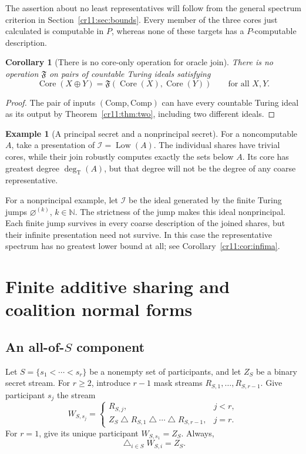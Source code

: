 \documentclass[11pt,letterpaper]{article}
\theoremstyle{plain}
\newtheorem{corollary}[theorem]{Corollary}
\theoremstyle{definition}
\newtheorem{example}[theorem]{Example}
\theoremstyle{remark}
\numberwithin{equation}{section}
\newcommand{\N}{\mathbb N}
\newcommand{\Core}{\operatorname{Core}}
\newcommand{\Low}{\operatorname{Low}}
\newcommand{\Comp}{\mathrm{Comp}}
\newcommand{\degT}{\deg_{\mathrm T}}
\newcommand{\bitsum}{\mathbin{\triangle}}
\newcommand{\join}{\mathbin{\oplus}}
\newcommand{\I}{\mathcal I}
\begin{document}
The assertion about no least representatives will follow from the general
spectrum criterion in Section~\ref{cr11:sec:bounds}. Every member of the three
cores just calculated is computable in $P$, whereas none of these targets
has a $P$-computable description.

\begin{corollary}[There is no core-only operation for oracle join]\label{cr11:cor:nooperation}
There is no operation $\mathfrak F$ on pairs of countable Turing ideals
satisfying
\[
             \Core(X\join Y)=\mathfrak F(\Core(X),\Core(Y))
             \qquad\text{for all }X,Y.
\]
\end{corollary}
\begin{proof}
The pair of inputs $(\Comp,\Comp)$ can have every countable Turing ideal
as its output by Theorem~\ref{cr11:thm:two}, including two different ideals.
\end{proof}

\begin{example}[A principal secret and a nonprincipal secret]
For a noncomputable $A$, take a presentation of $\I=\Low(A)$. The individual
shares have trivial cores, while their join robustly computes exactly the
sets below $A$. Its core has greatest degree $\degT(A)$, but that degree
will not be the degree of any coarse representative.

For a nonprincipal example, let $\I$ be the ideal generated by the finite
Turing jumps $\varnothing^{(k)}$, $k\in\N$. The strictness of the jump
makes this ideal nonprincipal. Each finite jump survives in every coarse
description of the joined shares, but their infinite presentation need not
survive. In this case the representative spectrum has no greatest lower
bound at all; see Corollary~\ref{cr11:cor:infima}.
\end{example}

\section{Finite additive sharing and coalition normal forms}\label{cr11:sec:algebra}

\subsection{An all-of-$S$ component}

Let $S=\{s_1<\cdots<s_r\}$ be a nonempty set of participants, and let $Z_S$
be a binary secret stream. For $r\geq2$, introduce $r-1$ mask streams
$R_{S,1},\ldots,R_{S,r-1}$. Give participant $s_j$ the stream
\begin{equation}\label{cr11:eq:shares}
 W_{S,s_j}=
 \begin{cases}
 R_{S,j},&j<r,\\
 Z_S\bitsum R_{S,1}\bitsum\cdots\bitsum R_{S,r-1},&j=r.
 \end{cases}
\end{equation}
For $r=1$, give its unique participant $W_{S,s_1}=Z_S$.
Always,
\begin{equation}\label{cr11:eq:parity}
                        \mathop{\triangle}_{i\in S}W_{S,i}=Z_S.
\end{equation}
\end{document}
